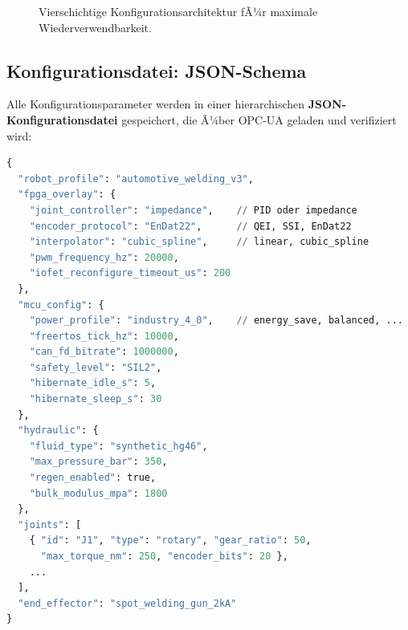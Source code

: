 ﻿\documentclass[a4paper,12pt]{scrreprt}
\theoremstyle{definition}
\begin{document}
\begin{figure}[H]
\centering
{}
\caption{Vierschichtige Konfigurationsarchitektur fÃ¼r maximale
  Wiederverwendbarkeit.}
\label{fig:konfig}
\end{figure}

\subsection{Konfigurationsdatei: JSON-Schema}

Alle Konfigurationsparameter werden in einer hierarchischen
\textbf{JSON-Konfigurationsdatei} gespeichert, die Ã¼ber OPC-UA
geladen und verifiziert wird:

\begin{lstlisting}[caption={IoFET-Roboter Konfigurationsdatei (Ausschnitt)},
  language=Python, morekeywords={true,false,null}]
{
  "robot_profile": "automotive_welding_v3",
  "fpga_overlay": {
    "joint_controller": "impedance",    // PID oder impedance
    "encoder_protocol": "EnDat22",      // QEI, SSI, EnDat22
    "interpolator": "cubic_spline",     // linear, cubic_spline
    "pwm_frequency_hz": 20000,
    "iofet_reconfigure_timeout_us": 200
  },
  "mcu_config": {
    "power_profile": "industry_4_0",    // energy_save, balanced, ...
    "freertos_tick_hz": 10000,
    "can_fd_bitrate": 1000000,
    "safety_level": "SIL2",
    "hibernate_idle_s": 5,
    "hibernate_sleep_s": 30
  },
  "hydraulic": {
    "fluid_type": "synthetic_hg46",
    "max_pressure_bar": 350,
    "regen_enabled": true,
    "bulk_modulus_mpa": 1800
  },
  "joints": [
    { "id": "J1", "type": "rotary", "gear_ratio": 50,
      "max_torque_nm": 250, "encoder_bits": 20 },
    ...
  ],
  "end_effector": "spot_welding_gun_2kA"
}
\end{lstlisting}
\end{document}
